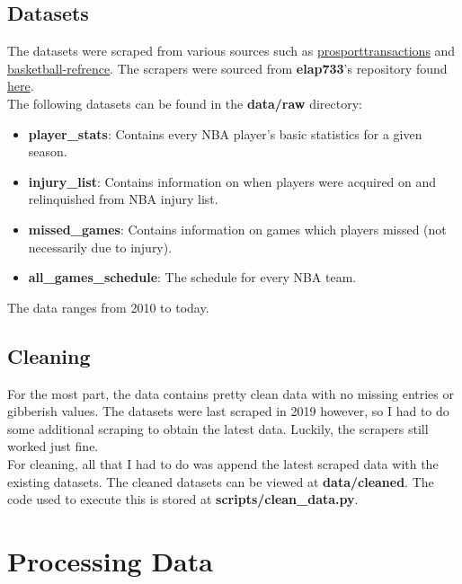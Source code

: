 \documentclass{article}
\begin{document}
\subsection*{Datasets}

The datasets were scraped from various sources such as
\href{https://www.prosportstransactions.com/basketball}{prosporttransactions} and
\href{https://www.basketball-reference.com/}{basketball-refrence}. The scrapers
were sourced from \textbf{elap733}'s repository found
\href{https://github.com/elap733/NBA-Injuries-Analysis/tree/master/src/d01_scrapes}{here}.\\

The following datasets can be found in the \textbf{data/raw} directory:
\begin{itemize}
    \item \textbf{player\_stats}: Contains every NBA player's basic statistics for a given season.
    \item \textbf{injury\_list}: Contains information on when players were acquired on and relinquished from NBA injury list.
    \item \textbf{missed\_games}: Contains information on games which players missed (not necessarily due to injury).
    \item \textbf{all\_games\_schedule}: The schedule for every NBA team.
\end{itemize}

The data ranges from 2010 to today.

\subsection*{Cleaning}

For the most part, the data contains pretty clean data with no missing entries
or gibberish values. The datasets were last scraped in 2019 however, so I had to
do some additional scraping to obtain the latest data. Luckily, the scrapers
still worked just fine.\\

For cleaning, all that I had to do was append the latest scraped data
with the existing datasets. The cleaned datasets can be viewed at \textbf{data/cleaned}.
The code used to execute this is stored at \textbf{scripts/clean\_data.py}.

\section*{Processing Data}
\end{document}
